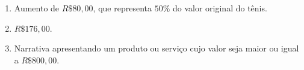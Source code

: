 \documentclass[10 pt,usenames,dvipsnames, oneside]{article}
\begin{document}
\ifdefined\prof
\begin{solucao}

	\begin{enumerate}

	\item{}
	Aumento de $R\$ 80,00$, que representa $50\%$ do valor original do tênis.

	\item{}
	$R\$ 176,00$.

	\item{}
	Narrativa apresentando um produto ou serviço cujo valor seja maior ou igual a $R\$ 800,00$.

	\end{enumerate}

\end{solucao}
\fi
\end{document}
